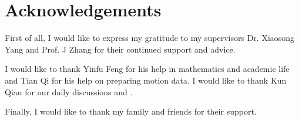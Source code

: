 \section*{Acknowledgements}

First of all, I would like to express my gratitude to my supervisors Dr. Xiaosong Yang and Prof. J Zhang for their continued support and advice.

I would like to thank Yinfu Feng for his help in mathematics and academic life and Tian Qi for his help on preparing motion data.  I would like to thank Kun Qian for our daily discussions and .

Finally, I would like to thank my family and friends for their support.

\pagebreak
